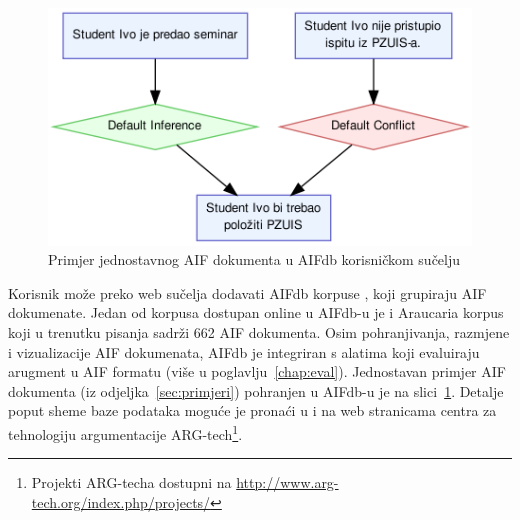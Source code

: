 \begin{figure}[h!]
    \centering
    \includegraphics[scale=0.8]{aifdb_ex.png}
\caption{Primjer jednostavnog AIF dokumenta u AIFdb korisničkom sučelju}
\label{fig:aifdb_ex}
\end{figure}

Korisnik može preko web sučelja dodavati AIFdb korpuse \citep{lawrence2014aifdb}, 
koji grupiraju AIF dokumenate. 
Jedan od korpusa dostupan online u AIFdb-u je i Araucaria korpus koji 
u trenutku pisanja sadrži 662 AIF dokumenta. 
Osim pohranjivanja, razmjene i vizualizacije AIF dokumenata, AIFdb je integriran 
s alatima koji evaluiraju arugment u AIF formatu (više u poglavlju~\ref{chap:eval}). 
Jednostavan primjer AIF dokumenta (iz odjeljka~\ref{sec:primjeri})
pohranjen u AIFdb-u je na slici~\ref{fig:aifdb_ex}. Detalje poput sheme 
baze podataka moguće je pronaći u \citep{lawrence2014aifdb} i na web stranicama
centra za tehnologiju argumentacije  
ARG-tech\footnote{Projekti ARG-techa dostupni na \url{http://www.arg-tech.org/index.php/projects/}}.




